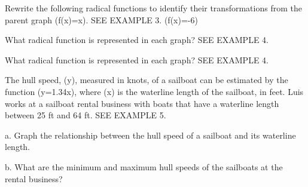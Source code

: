 \documentclass{article}
\newenvironment{practice}[2]{}{}        %
\newcommand{\answer}[1]{}               %
\newcommand{\placeholder}[2]{}          %
\newcommand{\te}[1]{}                   %
\begin{document}
\begin{practice}{25}{2}
Rewrite the following radical functions to identify their transformations from the parent graph (f(x)=\sqrt x). SEE EXAMPLE 3.
(f(x)=-6)
\answer{(f(x)=2\sqrt{x-6}-6); vertical stretch by a factor of 2, translation 6 units right, and translation 6 units down}
\end{practice}
\begin{practice}{26}{2}
What radical function is represented in each graph? SEE EXAMPLE 4.
\placeholder{graph}{Red increasing square root curve, filled labeled endpoint(1,1) and point(5,3), arrow right. Axes x,y, positive arrows, unit grid x=0 to 8,y=0 to 8, labels 0,2,4,6 on both. Represents sqrt(x-1)+1.}
\answer{(f(x)=\sqrt{x-1}+1)}
\end{practice}
\begin{practice}{27}{2}
What radical function is represented in each graph? SEE EXAMPLE 4.
\placeholder{graph}{Red increasing cube root curve centered at filled labeled(-2,3), additional filled labeled(-1,4); arrows both ends. Axes x,y arrows both ends, unit grid x=-5 to 3,y=-1 to 8; labels x-4,-2,2 and y2,4,6; origin O. Represents cube root(x+2)+3.}
\answer{(g(x)=\sqrt[3]{x+2}+3)}
\end{practice}
\begin{practice}{28}{3}
The hull speed, (y), measured in knots, of a sailboat can be estimated by the function (y=1.34\sqrt x), where (x) is the waterline length of the sailboat, in feet. Luis works at a sailboat rental business with boats that have a waterline length between 25 ft and 64 ft. SEE EXAMPLE 5.
\placeholder{photo}{White sailboat at sea with triangular sails. Horizontal dimension line beneath the boat marks its waterline length as 25 ft.}
a. Graph the relationship between the hull speed of a sailboat and its waterline length.
\answer{a. See graph.}
\placeholder{graph}{Answer 28a, printed on PDF45: red y=1.34sqrt(x) begins(0,0), continues to arrow near(64,10.7). Axes x,y with positive arrows, x grid 5 labels 0,10,20,30,40,50,60 and window 0 to 65; y grid 1 labels 0,2,4,6,8,10,12, window 0 to 12. No endpoint restriction or dots.}
b. What are the minimum and maximum hull speeds of the sailboats at the rental business?
\answer{b. The minimum hull speed of the sailboat Chair wants to purchase is 6.7 knots and the maximum hull speed is 10.72 knots.}
\te{Printed Chair wants to purchase; prompt names Luis and a rental business. Answers for 22--28 are printed on the next page.}
\end{practice}
\end{document}
